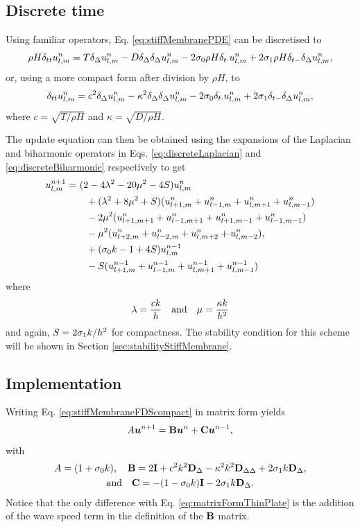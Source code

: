 {\subsection{Discrete time}
Using familiar operators, Eq. \eqref{eq:stiffMembranePDE} can be discretised to 
\begin{equation}\label{eq:stiffMembraneFDS}
    \rho H \delta_{tt} u_{l,m}^n = T\delta_{\Delta}u_{l,m}^n- D \delta_{\Delta}\delta_{\Delta}u_{l,m}^n - 2\sigma_{0} \rho H \delta_{t\cdot} u_{l,m}^n + 2 \sigma_{1} \rho H \delta_{t-} \delta_{\Delta}u_{l,m}^n,
\end{equation}
or, using a more compact form after division by $\rho H$, to
\begin{equation}\label{eq:stiffMembraneFDScompact}
    \delta_{tt} u_{l,m}^n = c^2\delta_{\Delta}u_{l,m}^n- \kappa^2 \delta_{\Delta}\delta_{\Delta}u_{l,m}^n - 2\sigma_{0} \delta_{t\cdot} u_{l,m}^n + 2 \sigma_{1} \delta_{t-} \delta_{\Delta}u_{l,m}^n,
\end{equation}
where $c = \sqrt{T / \rho H}$ and $\kappa = \sqrt{D / \rho H}$.

The update equation can then be obtained using the expansions of the Laplacian and biharmonic operators in Eqs. \eqref{eq:discreteLaplacian} and \eqref{eq:discreteBiharmonic} respectively to get
\begin{equation}\label{eq:stiffMembraneUpdate}
    \begin{aligned}
    u_{l,m}^{n+1} =&\ (2 - 4\lambda^2 - 20\mu^2 - 4S)u_{l,m}^n \\
    &\ \ \ +(\lambda^2 + 8\mu^2 + S)(u_{l+1, m}^n + u_{l-1, m}^n+u_{l, m+1}^n+u_{l, m-1}^n)\\
    &\ \ \ -2\mu^2(u_{l+1, m+1}^n + u_{l-1, m+1}^n+u_{l+1, m-1}^n+u_{l-1, m-1}^n)\\
    &\ \ \ -\mu^2(u_{l+2, m}^n + u_{l-2, m}^n+u_{l, m+2}^n+u_{l, m-2}^n),\\
    &\ \ \ + (\sigma_{0} k  - 1 + 4S) u_{l,m}^{n-1}\\
    &\ \ \ - S (u_{l+1, m}^{n-1} + u_{l-1, m}^{n-1}+u_{l, m+1}^{n-1}+u_{l, m-1}^{n-1})
    \end{aligned}
\end{equation}
where 
\begin{equation}\label{eq:lambdaMuStiffMembrane}
    \lambda = \frac{c k}{h}\quad \text{and} \quad \mu = \frac{\kappa k}{h^2}
\end{equation}
and again, $S = 2\sigma_{1} k / h^2$ for compactness. The stability condition for this scheme will be shown in Section \ref{sec:stabilityStiffMembrane}.

\subsection{Implementation}
Writing  Eq. \eqref{eq:stiffMembraneFDScompact} in matrix form yields 
\begin{equation}
    A\boldsymbol{u}^{n+1} = \mathbf{B}\boldsymbol{u}^n + \mathbf{C}\boldsymbol{u}^{n-1},
\end{equation}
with
\begin{gather*}
    A = (1+\sigma_{0} k),\quad \mathbf{B} = 2\mathbf{I} + c^2k^2 \mathbf{D}_\Delta - \kappa^2 k^2 \mathbf{D}_{\Delta\Delta} + 2 \sigma_{1} k\mathbf{D}_\Delta, \\
    \text{and}\quad \mathbf{C} = -(1-\sigma_{0} k)\mathbf{I} - 2\sigma_{1} k \mathbf{D}_\Delta.
\end{gather*}
Notice that the only difference with Eq. \eqref{eq:matrixFormThinPlate} is the addition of the wave speed term in the definition of the $\mathbf{B}$ matrix. 

}
